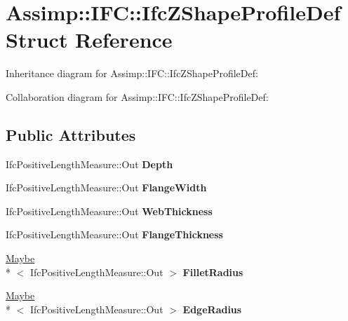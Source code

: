 \hypertarget{struct_assimp_1_1_i_f_c_1_1_ifc_z_shape_profile_def}{\section{Assimp\+:\+:I\+F\+C\+:\+:Ifc\+Z\+Shape\+Profile\+Def Struct Reference}
\label{struct_assimp_1_1_i_f_c_1_1_ifc_z_shape_profile_def}
}


Inheritance diagram for Assimp\+:\+:I\+F\+C\+:\+:Ifc\+Z\+Shape\+Profile\+Def\+:


Collaboration diagram for Assimp\+:\+:I\+F\+C\+:\+:Ifc\+Z\+Shape\+Profile\+Def\+:
\subsection*{Public Attributes}
\begin{DoxyCompactItemize}
\item 
\hypertarget{struct_assimp_1_1_i_f_c_1_1_ifc_z_shape_profile_def_a6d22f625a4a431a9736260c2b963a37d}{Ifc\+Positive\+Length\+Measure\+::\+Out {\bfseries Depth}}\label{struct_assimp_1_1_i_f_c_1_1_ifc_z_shape_profile_def_a6d22f625a4a431a9736260c2b963a37d}

\item 
\hypertarget{struct_assimp_1_1_i_f_c_1_1_ifc_z_shape_profile_def_a8529a4cc31dd705388fbc24abafa8e44}{Ifc\+Positive\+Length\+Measure\+::\+Out {\bfseries Flange\+Width}}\label{struct_assimp_1_1_i_f_c_1_1_ifc_z_shape_profile_def_a8529a4cc31dd705388fbc24abafa8e44}

\item 
\hypertarget{struct_assimp_1_1_i_f_c_1_1_ifc_z_shape_profile_def_aa6ea9e36ce4e76f9221e6050f54dc6cb}{Ifc\+Positive\+Length\+Measure\+::\+Out {\bfseries Web\+Thickness}}\label{struct_assimp_1_1_i_f_c_1_1_ifc_z_shape_profile_def_aa6ea9e36ce4e76f9221e6050f54dc6cb}

\item 
\hypertarget{struct_assimp_1_1_i_f_c_1_1_ifc_z_shape_profile_def_ac299a0cb926e95daa725b8cd48c33ec5}{Ifc\+Positive\+Length\+Measure\+::\+Out {\bfseries Flange\+Thickness}}\label{struct_assimp_1_1_i_f_c_1_1_ifc_z_shape_profile_def_ac299a0cb926e95daa725b8cd48c33ec5}

\item 
\hypertarget{struct_assimp_1_1_i_f_c_1_1_ifc_z_shape_profile_def_a8ab6ab307782e25cc05855d28f37ccc9}{\hyperlink{struct_assimp_1_1_s_t_e_p_1_1_maybe}{Maybe}\\*
$<$ Ifc\+Positive\+Length\+Measure\+::\+Out $>$ {\bfseries Fillet\+Radius}}\label{struct_assimp_1_1_i_f_c_1_1_ifc_z_shape_profile_def_a8ab6ab307782e25cc05855d28f37ccc9}

\item 
\hypertarget{struct_assimp_1_1_i_f_c_1_1_ifc_z_shape_profile_def_afc7ed1451060f889c48460e57641c3f1}{\hyperlink{struct_assimp_1_1_s_t_e_p_1_1_maybe}{Maybe}\\*
$<$ Ifc\+Positive\+Length\+Measure\+::\+Out $>$ {\bfseries Edge\+Radius}}\label{struct_assimp_1_1_i_f_c_1_1_ifc_z_shape_profile_def_afc7ed1451060f889c48460e57641c3f1}

\end{DoxyCompactItemize}
